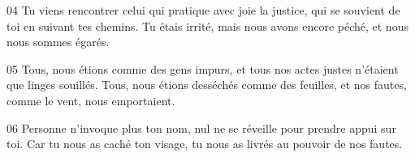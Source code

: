 
04 Tu viens rencontrer celui qui pratique avec joie la justice, qui se souvient de toi en suivant tes chemins. Tu étais irrité, mais nous avons encore péché, et nous nous sommes égarés.

05 Tous, nous étions comme des gens impurs, et tous nos actes justes n’étaient que linges souillés. Tous, nous étions desséchés comme des feuilles, et nos fautes, comme le vent, nous emportaient.

06 Personne n’invoque plus ton nom, nul ne se réveille pour prendre appui sur toi. Car tu nous as caché ton visage, tu nous as livrés au pouvoir de nos fautes.
